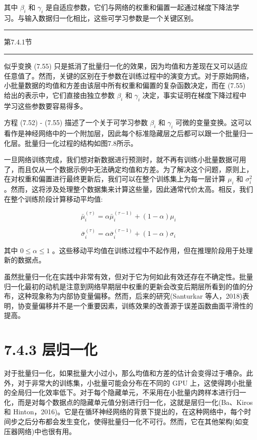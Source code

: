 \documentclass[10pt]{article}
\newcommand{\HRule}{\begin{center}\rule{0.9\linewidth}{0.2mm}\end{center}}
\begin{document}
其中 \({\beta }_{i}\) 和 \({\gamma }_{i}\) 是自适应参数，它们与网络的权重和偏置一起通过梯度下降法学习。与输入数据归一化相比，这些可学习参数是一个关键区别。

\HRule

第7.4.1节

\HRule

似乎变换 (7.55) 只是抵消了批量归一化的效果，因为均值和方差现在又可以适应任意值了。然而，关键的区别在于参数在训练过程中的演变方式。对于原始网络，小批量数据的均值和方差由该层中所有权重和偏置的复杂函数决定，而在 (7.55) 给出的表示中，它们直接由独立参数 \({\beta }_{i}\) 和 \({\gamma }_{i}\) 决定，事实证明在梯度下降过程中学习这些参数要容易得多。

方程 (7.52) - (7.55) 描述了一个关于可学习参数 \({\beta }_{i}\) 和 \({\gamma }_{i}\) 可微的变量变换。这可以看作是神经网络中的一个附加层，因此每个标准隐藏层之后都可以跟一个批量归一化层。批量归一化过程的结构如图7.8所示。

一旦网络训练完成，我们想对新数据进行预测时，就不再有训练小批量数据可用了，而且仅从一个数据示例中无法确定均值和方差。为了解决这个问题，原则上，在对权重和偏置进行最终更新后，我们可以在整个训练集上为每一层计算 \({\mu }_{i}\) 和 \({\sigma }_{i}^{2}\) 。然而，这将涉及处理整个数据集来计算这些量，因此通常代价太高。相反，我们在整个训练阶段计算移动平均值:

\[
{\bar{\mu }}_{i}^{\left( \tau \right) } = \alpha {\bar{\mu }}_{i}^{\left( \tau  - 1\right) } + \left( {1 - \alpha }\right) {\mu }_{i} \tag{7.56}
\]

\[
{\bar{\sigma }}_{i}^{\left( \tau \right) } = \alpha {\bar{\sigma }}_{i}^{\left( \tau  - 1\right) } + \left( {1 - \alpha }\right) {\sigma }_{i} \tag{7.57}
\]

其中 \(0 \leq  \alpha  \leq  1\) 。这些移动平均值在训练过程中不起作用，但在推理阶段用于处理新的数据点。

虽然批量归一化在实践中非常有效，但对于它为何如此有效还存在不确定性。批量归一化最初的动机是注意到网络早期层中权重的更新会改变后期层所看到的值的分布，这种现象称为内部协变量偏移。然而，后来的研究(Santurkar 等人，2018)表明，协变量偏移并不是一个重要因素，训练效果的改善源于误差函数曲面平滑性的提高。

\section*{7.4.3 层归一化}

对于批量归一化，如果批量大小过小，那么均值和方差的估计会变得过于嘈杂。此外，对于非常大的训练集，小批量可能会分布在不同的 GPU 上，这使得跨小批量的全局归一化效率低下。对于每个隐藏单元，不采用在小批量内跨样本进行归一化，而是对每个数据点的隐藏单元值分别进行归一化，这就是层归一化(Ba、Kiros 和 Hinton，2016)。它是在循环神经网络的背景下提出的，在这种网络中，每个时间步之后分布都会发生变化，使得批量归一化不可行。然而，它在其他架构(如变压器网络)中也很有用。
\end{document}
